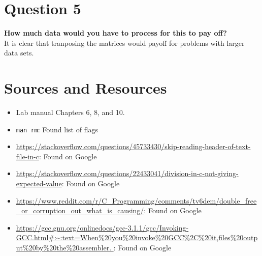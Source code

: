 \documentclass{article}
\begin{document}
\newpage


\section{Question 5}

\textbf{How much data would you have to process for this to pay off?} \\


It is clear that tranposing the matrices would payoff for problems with larger data sets. \\


\newpage

\section{Sources and Resources}

\begin{flushleft}
  \begin{itemize}
  \item{Lab manual Chapters 6, 8, and 10.}
    \item{\texttt{man rm}: Found list of flags}
    \item{\url{https://stackoverflow.com/questions/45733430/skip-reading-header-of-text-file-in-c}: Found on Google}
    \item{\url{https://stackoverflow.com/questions/22433041/division-in-c-not-giving-expected-value}: Found on Google}
    \item{\url{https://www.reddit.com/r/C_Programming/comments/tv6dem/double_free_or_corruption_out_what_is_causing/}: Found on Google}
    \item{\url{https://gcc.gnu.org/onlinedocs/gcc-3.1.1/gcc/Invoking-GCC.html#:~:text=When%
}: Found on Google}
  \end{itemize}
\end{flushleft}
\end{document}
